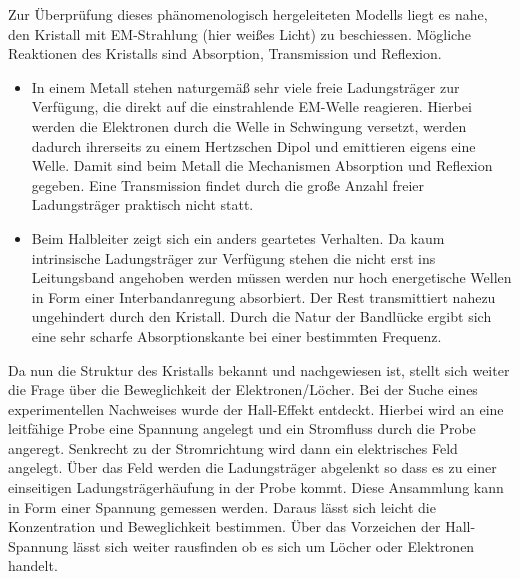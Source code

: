 Zur Überprüfung dieses phänomenologisch hergeleiteten Modells liegt es nahe, den Kristall mit EM-Strahlung (hier weißes Licht) zu beschiessen. Mögliche Reaktionen des Kristalls sind Absorption, Transmission und Reflexion. 
\begin{itemize}
	\item In einem Metall stehen naturgemäß sehr viele freie Ladungsträger zur Verfügung, die direkt auf die einstrahlende EM-Welle reagieren. Hierbei werden die Elektronen durch die Welle in Schwingung versetzt, werden dadurch ihrerseits zu einem Hertzschen Dipol und emittieren eigens eine Welle. Damit sind beim Metall die Mechanismen Absorption und Reflexion gegeben. Eine Transmission findet durch die große Anzahl freier Ladungsträger praktisch nicht statt.
	\item Beim Halbleiter zeigt sich ein anders geartetes Verhalten. Da kaum intrinsische Ladungsträger zur Verfügung stehen die nicht erst ins Leitungsband angehoben werden müssen werden nur hoch energetische Wellen in Form einer Interbandanregung absorbiert. Der Rest transmittiert nahezu ungehindert durch den Kristall. Durch die Natur der Bandlücke ergibt sich eine sehr scharfe Absorptionskante bei einer bestimmten Frequenz.
\end{itemize}

Da nun die Struktur des Kristalls bekannt und nachgewiesen ist, stellt sich weiter die Frage über die Beweglichkeit der Elektronen/Löcher. Bei der Suche eines experimentellen Nachweises wurde der Hall-Effekt entdeckt. Hierbei wird an eine leitfähige Probe eine Spannung angelegt und ein Stromfluss durch die Probe angeregt. Senkrecht zu der Stromrichtung wird dann ein elektrisches Feld angelegt. Über das Feld werden die Ladungsträger abgelenkt so dass es zu einer einseitigen Ladungsträgerhäufung in der Probe kommt. Diese Ansammlung kann in Form einer Spannung gemessen werden. Daraus lässt sich leicht die Konzentration und Beweglichkeit bestimmen. Über das Vorzeichen der Hall-Spannung lässt sich weiter rausfinden ob es sich um Löcher oder Elektronen handelt.

